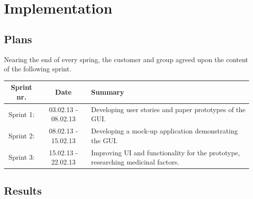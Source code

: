 \chapter{Implementation}
\section{Plans}


Nearing the end of every spring, the customer and group agreed upon the content of the following sprint. 


\begin{tabular}{|c|c|p{6cm}|}
\hline
Sprint nr. & Date & Summary\\
\hline
Sprint 1: & 03.02.13 - 08.02.13 & Developing user stories and paper prototypes of the GUI.\\ 
\hline
Sprint 2: & 08.02.13 - 15.02.13 & Developing a mock-up application demonstrating the GUI.\\
\hline
Sprint 3: & 15.02.13 - 22.02.13 & Improving UI and functionality for the prototype, researching medicinal factors. \\
\hline

\end{tabular} 

 

\section{Results}
